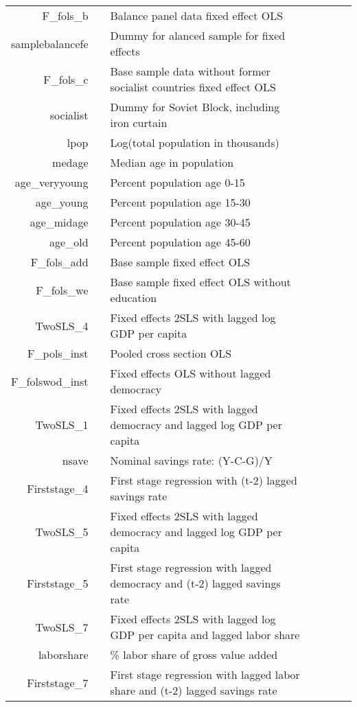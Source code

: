 \begin{tabular}{rp{0.2cm}lp{1cm}rp{0.2cm}l}
F\_fols\_b& &  Balance panel data fixed effect OLS       && &&     \\
samplebalancefe && Dummy for alanced sample for fixed effects   && &&   \\
F\_fols\_c    & & Base sample data without former socialist countries fixed effect OLS   && &&    \\
socialist& &   Dummy for Soviet Block, including iron curtain    && &&    \\
lpop & &  Log(total population in thousands)   && &&   \\
medage& &  Median age in population      && &&    \\
age\_veryyoung    & & Percent population age 0-15   && &&   \\
age\_young& &    Percent population age 15-30    && &&   \\
age\_midage    & & Percent population age 30-45   && &&    \\
age\_old& &    Percent population age 45-60      && &&     \\
F\_fols\_add   & &  Base sample fixed effect OLS  && &&   \\      
F\_fols\_we& &      Base sample fixed effect OLS without education   && &&    \\  
TwoSLS\_4  && Fixed effects 2SLS with lagged log GDP per capita  && &&   \\
F\_pols\_inst  && Pooled cross section OLS &&  &&  \\
F\_folswod\_inst  &&  Fixed effects OLS without lagged democracy && &&    \\
TwoSLS\_1  &&  Fixed effects 2SLS with lagged democracy and lagged log GDP per capita   && &&   \\
nsave  && Nominal savings rate: (Y-C-G)/Y  &&  &&  \\
Firststage\_4  &&  First stage regression with (t-2) lagged savings rate  && &&   \\
TwoSLS\_5  &&  Fixed effects 2SLS with lagged democracy and lagged log GDP per capita && &&   \\
Firststage\_5  &&  First stage regression with lagged democracy and (t-2) lagged savings rate && &&    \\
TwoSLS\_7  &&  Fixed effects 2SLS with lagged log GDP per capita and  lagged labor share && &&   \\
laborshare  && \% labor share of gross value added  &&   &&  \\
Firststage\_7  && First stage regression with lagged labor share and (t-2) lagged savings rate  && &&    \\

\end{tabular}
